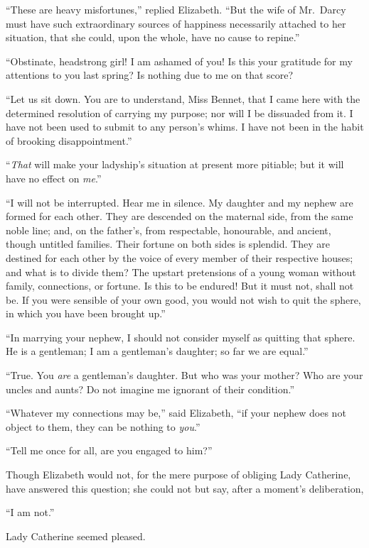 “These are heavy misfortunes,” replied Elizabeth.
“But the wife of Mr.\ Darcy must have such extraordinary
sources of happiness necessarily attached to her situation,
that she could, upon the whole, have no cause to repine.”

“Obstinate, headstrong girl! I am ashamed of you!
Is this your gratitude for my attentions to you last
spring? Is nothing due to me on that score?

“Let us sit down. You are to understand, Miss Bennet,
that I came here with the determined resolution of
carrying my purpose; nor will I be dissuaded from it.
I have not been used to submit to any person’s whims.
I have not been in the habit of brooking disappointment.”

“\textit{That} will make your ladyship’s situation at present
more pitiable; but it will have no effect on \textit{me}.”

“I will not be interrupted. Hear me in silence. My
daughter and my nephew are formed for each other. They
are descended on the maternal side, from the same noble
line; and, on the father’s, from respectable, honourable,
and ancient, though untitled families. Their fortune on
both sides is splendid. They are destined for each other
by the voice of every member of their respective houses;
and what is to divide them? The upstart pretensions of
a young woman without family, connections, or fortune.
Is this to be endured! But it must not, shall not be. If
you were sensible of your own good, you would not wish
to quit the sphere, in which you have been brought up.”

“In marrying your nephew, I should not consider myself
as quitting that sphere. He is a gentleman; I am a gentleman’s
daughter; so far we are equal.”

“True. You \textit{are} a gentleman’s daughter. But who was
your mother? Who are your uncles and aunts? Do not
imagine me ignorant of their condition.”

“Whatever my connections may be,” said Elizabeth,
“if your nephew does not object to them, they can be
nothing to \textit{you}.”

“Tell me once for all, are you engaged to him?”

Though Elizabeth would not, for the mere purpose of
obliging Lady Catherine, have answered this question;
she could not but say, after a moment’s deliberation,

“I am not.”

Lady Catherine seemed pleased.

